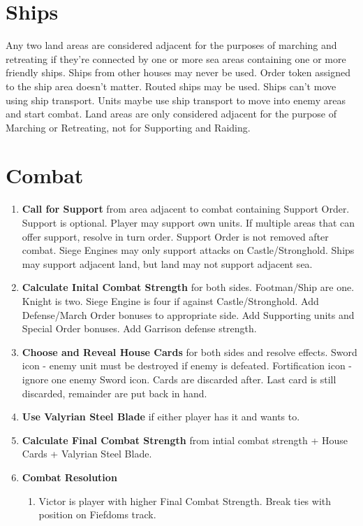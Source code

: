 \documentclass[12pt]{article}
\newenvironment{enumerateCustom}
{\begin{enumerate}
  \setlength{\itemsep}{1pt}
  \setlength{\parskip}{0pt}
  \setlength{\parsep}{0pt}}
{\end{enumerate}}
\begin{document}
\begin{multicols*}{2}
\section*{Ships}
Any two land areas are considered adjacent for the purposes of marching and retreating if they're connected by one or more sea areas containing one or more friendly ships. Ships from other houses may never be used. Order token assigned to the ship area doesn't matter. Routed ships may be used. Ships can't move using ship transport. Units maybe use ship transport to move into enemy areas and start combat. Land areas are only considered adjacent for the purpose of Marching or Retreating, not for Supporting and Raiding.

\section*{Combat}
\begin{enumerateCustom}
	\item \textbf{Call for Support} from area adjacent to combat containing Support Order. Support is optional. Player may support own units. If multiple areas that can offer support, resolve in turn order. Support Order is not removed after combat. Siege Engines may only support attacks on Castle/Stronghold. Ships may support adjacent land, but land may not support adjacent sea.
	\item \textbf{Calculate Inital Combat Strength} for both sides. Footman/Ship are one. Knight is two. Siege Engine is four if against Castle/Stronghold. Add Defense/March Order bonuses to appropriate side. Add Supporting units and Special Order bonuses. Add Garrison defense strength.
	\item \textbf{Choose and Reveal House Cards} for both sides and resolve effects. Sword icon - enemy unit must be destroyed if enemy is defeated. Fortification icon - ignore one enemy Sword icon. Cards are discarded after. Last card is still discarded, remainder are put back in hand.
	\item \textbf{Use Valyrian Steel Blade} if either player has it and wants to.
	\item \textbf{Calculate Final Combat Strength} from intial combat strength + House Cards + Valyrian Steel Blade.
	\item \textbf{Combat Resolution}
	\begin{enumerateCustom}
		\item Victor is player with higher Final Combat Strength. Break ties with position on Fiefdoms track.

\end{enumerateCustom}
\end{enumerateCustom}
\end{multicols*}
\end{document}
